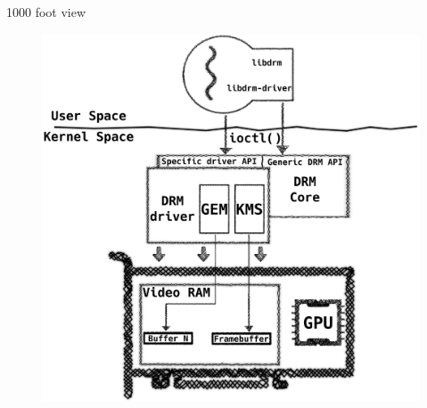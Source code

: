 \documentclass[10pt, compress, aspectratio=169]{beamer}
\begin{document}
\begin{frame}{1000 foot view}
  \begin{figure}
    \centering
    \includegraphics[width=\linewidth,
                     height=0.8\textheight,
                     keepaspectratio]{drm_api_3}
  \end{figure}
\end{frame}

\end{document}
